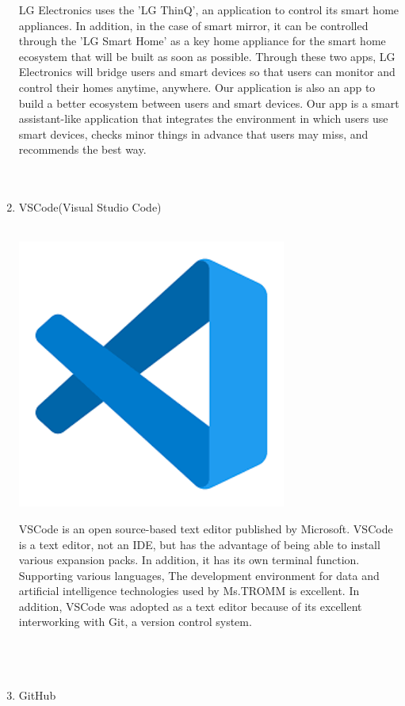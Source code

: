 \documentclass[conference]{IEEEtran}
\begin{document}
\begin{enumerate}
        LG Electronics uses the 'LG ThinQ', an application to control its smart home appliances. In addition, in the case of smart mirror, it can be controlled through the 'LG Smart Home' as a key home appliance for the smart home ecosystem that will be built as soon as possible. Through these two apps, LG Electronics will bridge users and smart devices so that users can monitor and control their homes anytime, anywhere. Our application is also an app to build a better ecosystem between users and smart devices. Our app is a smart assistant-like application that integrates the environment in which users use smart devices, checks minor things in advance that users may miss, and recommends the best way. \\ \\
    \\ 
    \item VSCode(Visual Studio Code) \\ \\
    \centerline{\includegraphics{assets/vs.png}}
    VSCode is an open source-based text editor published by Microsoft. VSCode is a text editor, not an IDE, but has the advantage of being able to install various expansion packs. In addition, it has its own terminal function. Supporting various languages, The development environment for data and artificial intelligence technologies used by Ms.TROMM is excellent. In addition, VSCode was adopted as a text editor because of its excellent interworking with Git, a version control system.\\ \\ \\ \\ 
    \item GitHub\\\\

\end{enumerate}
\end{document}
